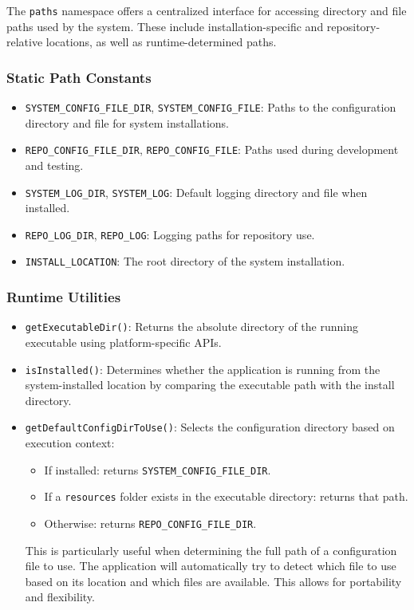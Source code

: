 The \texttt{paths} namespace offers a centralized interface for accessing directory and file paths used by the system. These include installation-specific and repository-relative locations, as well as runtime-determined paths.

\subsubsection*{Static Path Constants}
\begin{itemize}
	\item \texttt{SYSTEM\_CONFIG\_FILE\_DIR}, \texttt{SYSTEM\_CONFIG\_FILE}: Paths to the configuration directory and file for system installations.
	\item \texttt{REPO\_CONFIG\_FILE\_DIR}, \texttt{REPO\_CONFIG\_FILE}: Paths used during development and testing.
	\item \texttt{SYSTEM\_LOG\_DIR}, \texttt{SYSTEM\_LOG}: Default logging directory and file when installed.
	\item \texttt{REPO\_LOG\_DIR}, \texttt{REPO\_LOG}: Logging paths for repository use.
	\item \texttt{INSTALL\_LOCATION}: The root directory of the system installation.
\end{itemize}

\subsubsection*{Runtime Utilities} \label{sec:global-constants-utilities}
\begin{itemize}
	\item \texttt{getExecutableDir()}: Returns the absolute directory of the running executable using platform-specific APIs.
	
	\item \texttt{isInstalled()}: Determines whether the application is running from the system-installed location by comparing the executable path with the install directory.
	
	\item \texttt{getDefaultConfigDirToUse()}: Selects the configuration directory based on execution context:
	\begin{itemize}
		\item If installed: returns \texttt{SYSTEM\_CONFIG\_FILE\_DIR}.
		\item If a \texttt{resources} folder exists in the executable directory: returns that path.
		\item Otherwise: returns \texttt{REPO\_CONFIG\_FILE\_DIR}.
	\end{itemize}
	This is particularly useful when determining the full path of a configuration file to use. The application will automatically try to detect which file to use based on its location and which files are available. This allows for portability and flexibility.
\end{itemize}


